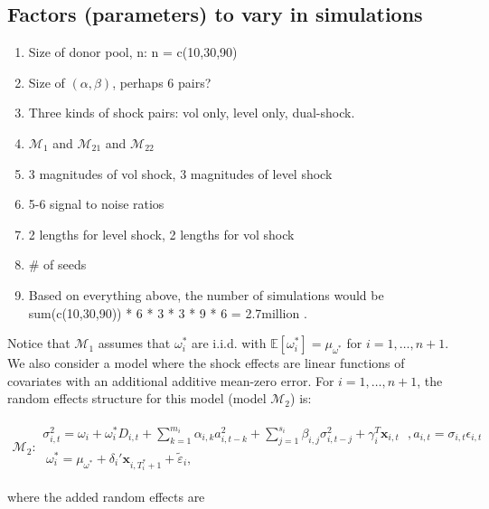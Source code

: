 \documentclass[11pt]{article}
\newcommand{\x}{\textbf{x}}
\def\mbf#1{\mathbf{#1}} %
\def\t#1{\tilde{#1}} %
\def\mc#1{\mathcal{#1}} %
\def\E{\mathbb{E}} %
\def\mc#1{\mathcal{#1}}
\theoremstyle{definition}
\begin{document}
\subsection{Factors (parameters) to vary in simulations}
\begin{enumerate}
\item Size of donor pool, n: n = c(10,30,90)
\item Size of $(\alpha, \beta)$, perhaps 6 pairs?
\item Three kinds of shock pairs: vol only, level only, dual-shock.
\item $\mc{M}_{1}$ and $\mc{M}_{21}$ and $\mc{M}_{22}$ 
\item 3 magnitudes of vol shock, 3 magnitudes of level shock
\item 5-6 signal to noise ratios
\item 2 lengths for level shock, 2 lengths for vol shock
\item # of seeds
\item Based on everything above, the number of simulations would be sum(c(10,30,90)) * 6 * 3 * 3 * 9 * 6 = 2.7million .
\end{enumerate}

Notice that $\mc{M}_1$ assumes that $\omega^{*}_i$ are i.i.d. with $\E[ \omega^{*}_i]=\mu_{\omega^{*}}$ 
for $i = 1, \ldots, n+1$. We also consider a model where the shock effects are linear functions of covariates with an additional additive mean-zero error. For $i = 1, \ldots, n+1$, the random effects structure for this model (model $\mc{M}_2$) is:




\begin{align}
\mc{M}_2 \colon \begin{array}{l}
   \sigma^{2}_{i,t} = \omega_{i} + \omega^{*}_i D_{i,t}  + \sum^{m_{i}}_{k=1}\alpha_{i,k}a^{2}_{i,t-k} + \sum_{j=1}^{s_{i}}\beta_{i,j}\sigma_{i,t-j}^{2} + \gamma_{i}^{T} \x_{i,t} \text{ }, a_{i,t} = \sigma_{i,t}\epsilon_{i,t}\\[.2cm]
  \; \omega_i^{*} = \mu_{\omega^{*}}+\delta_{i}'\mbf{x}_{i, T_i^*+1}+ \t{\varepsilon}_{i},
\end{array}\label{model2}
\end{align}

 where the added random effects are
\end{document}
